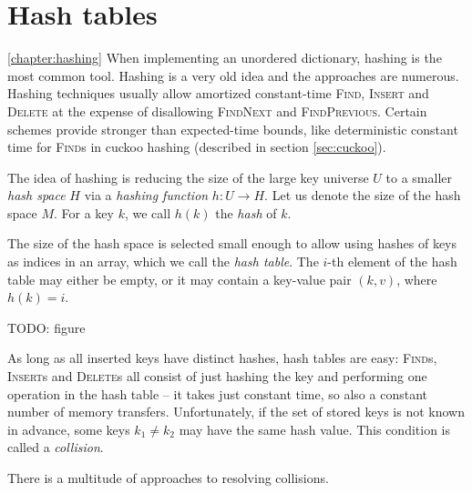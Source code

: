 \chapter{Hash tables}
\ref{chapter:hashing}
When implementing an unordered dictionary, hashing is the most common tool.
Hashing is a very old idea and the approaches are numerous. Hashing
techniques usually allow amortized constant-time \textsc{Find}, \textsc{Insert}
and \textsc{Delete} at the expense of disallowing \textsc{FindNext} and
\textsc{FindPrevious}. Certain schemes provide stronger than expected-time
bounds, like deterministic constant time for \textsc{Find}s in cuckoo hashing
(described in section \ref{sec:cuckoo}).

The idea of hashing is reducing the size of the large key universe $U$ to
a smaller \emph{hash space} $H$ via a \emph{hashing function}
$h\mathop{:}U\rightarrow H$.
Let us denote the size of the hash space $M$.
For a key $k$, we call $h(k)$ the \emph{hash} of $k$.

The size of the hash space is selected small enough to allow using hashes
of keys as indices in an array, which we call the \emph{hash table}.
The $i$-th element of the hash table may either be empty, or it may contain
a key-value pair $(k,v)$, where $h(k)=i$.

TODO: figure

As long as all inserted keys have distinct hashes, hash tables are easy:
\textsc{Find}s, \textsc{Insert}s and \textsc{Delete}s all consist of just
hashing the key and performing one operation in the hash table -- it takes just
constant time, so also a constant number of memory transfers.
Unfortunately, if the set of stored keys is not known in advance,
some keys $k_1\neq k_2$ may have the same hash value.
This condition is called a \emph{collision}.

There is a multitude of approaches to resolving collisions.

